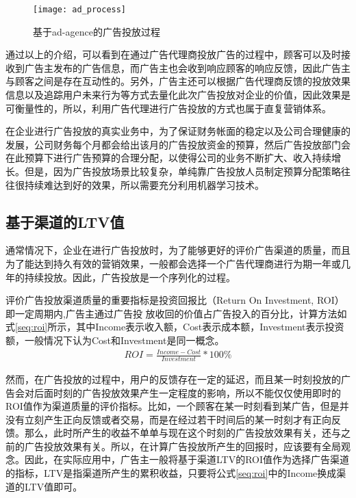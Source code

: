 \begin{figure}[htbp]
\centering
\texttt{[image: ad\_process]}
\caption{基于ad-agence的广告投放过程}
\label{fig:ad_process}
\end{figure}

通过以上的介绍，可以看到在通过广告代理商投放广告的过程中，顾客可以及时接收到广告主发布的广告信息，而广告主也会收到响应顾客的响应反馈，因此广告主与顾客之间是存在互动性的。另外，广告主还可以根据广告代理商反馈的投放效果信息以及追踪用户未来行为等方式去量化此次广告投放对企业的价值，因此效果是可衡量性的，所以，利用广告代理进行广告投放的方式也属于直复营销体系。

在企业进行广告投放的真实业务中，为了保证财务帐面的稳定以及公司合理健康的发展，公司财务每个月都会给出该月的广告投放资金的预算，然后广告投放部门会在此预算下进行广告预算的合理分配，以使得公司的业务不断扩大、收入持续增长。但是，因为广告投放场景比较复杂，单纯靠广告投放人员制定预算分配策略往往很持续难达到好的效果，所以需要充分利用机器学习技术。

\subsection{基于渠道的LTV值}
通常情况下，企业在进行广告投放时，为了能够更好的评价广告渠道的质量，而且为了能达到持久有效的营销效果，一般都会选择一个广告代理商进行为期一年或几年的持续投放。因此，广告投放是一个序列化的过程。

评价广告投放渠道质量的重要指标是投资回报比（Return On Investment, ROI）即一定周期内,广告主通过广告投
放收回的价值占广告投入的百分比，计算方法如式\eqref{seq:roi}所示，其中Income表示收入额，Cost表示成本额，Investment表示投资额，一般情况下认为Cost和Investment是同一概念。
\begin{equation}\label{seq:roi}
\begin{aligned}
 ROI=\frac{Income-Cost}{Investment}*100\%
\end{aligned}
\end{equation}

然而，在广告投放的过程中，用户的反馈存在一定的延迟，而且某一时刻投放的广告会对后面时刻的广告投放效果产生一定程度的影响，所以不能仅仅使用即时的ROI值作为渠道质量的评价指标。比如，一个顾客在某一时刻看到某广告，但是并没有立刻产生正向反馈或者交易，而是在经过若干时间后的某一时刻才有正向反馈。那么，此时所产生的收益不单单与现在这个时刻的广告投放效果有关，还与之前的广告投放效果有关。所以，在计算广告投放所产生的回报时，应该要有全局观念。因此，在实际应用中，广告主一般将基于渠道LTV的ROI值作为选择广告渠道的指标，LTV是指渠道所产生的累积收益，只要将公式\eqref{seq:roi}中的Income换成渠道的LTV值即可。

